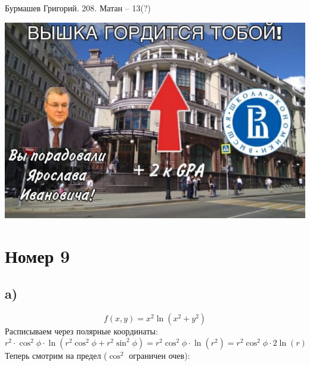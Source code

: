 \documentclass[a4paper,12pt]{article}
\author{Бурмашев Григорий, БПМИ-208}
\title{}
\date{\today}
\begin{document}
{\Large \begin{center}
Бурмашев Григорий. 208. Матан -- 13(?)
\end{center}}

\begin{center}
\includegraphics[scale=0.6]{1.jpg}
\end{center}
\clearpage
\section*{Номер 9}
\subsection*{a)}
\[
f(x, y) = x^2 \ln \left(x^2 + y^2 \right)
\]
Расписываем через полярные координаты:
\[
r^2 \cdot \cos^2 \phi  \cdot \ln(r^2 \cos^2 \phi + r^2 \sin^2 \phi) = r^2 \cos^2 \phi \cdot \ln (r^2) =  r^2 \cos^2 \phi \cdot 2\ln (r) 
\]
Теперь смотрим на предел ($\cos^2$ ограничен очев):
\end{document}
